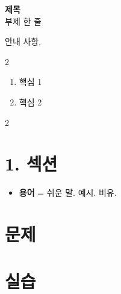 \documentclass[10pt]{report}
\begin{document}
\small
\begin{center}{\large\bfseries 제목}\\[1pt]{\footnotesize 부제 한 줄}\end{center}
\begin{warnbox}[공지]안내 사항.\end{warnbox}
\begin{keybox}[딱 이것만]
\begin{multicols}{2}\begin{enumerate}[leftmargin=1.3em]\item 핵심 1\item 핵심 2\end{enumerate}\end{multicols}
\end{keybox}
\begin{multicols}{2}\raggedright
\section{1. 섹션}
\begin{itemize}\item \textbf{용어} = 쉬운 말. \eg 예시. \bi 비유.\end{itemize}
\section{문제}
\section{실습}
\begin{enumerate}[leftmargin=1.3em]
\end{enumerate}
\end{multicols}
\end{document}
